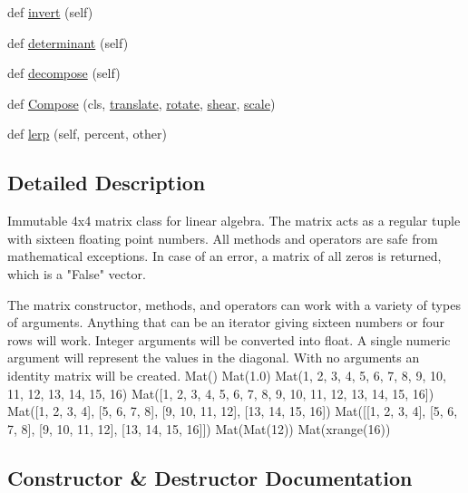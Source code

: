 \begin{DoxyCompactItemize}
\item 
def \hyperlink{classminivec_1_1minivec_1_1_mat_ad39a776c942f5a3939e5bbd95e430f1d}{invert} (self)
\item 
def \hyperlink{classminivec_1_1minivec_1_1_mat_a7b0a26d6c5202fc7fe3b9bc84c7588b9}{determinant} (self)
\item 
def \hyperlink{classminivec_1_1minivec_1_1_mat_a83c559b35a4814f014308d03ddbcdad2}{decompose} (self)
\item 
def \hyperlink{classminivec_1_1minivec_1_1_mat_ab94d8bf4ddf0463496fb78809f73ad9a}{Compose} (cls, \hyperlink{classminivec_1_1minivec_1_1_mat_a6378a96e89d988b74338258e01e8a9c3}{translate}, \hyperlink{classminivec_1_1minivec_1_1_mat_a7d119e23e74d182f54ca330fe9c65a3c}{rotate}, \hyperlink{classminivec_1_1minivec_1_1_mat_a03450442e730a17d66e07614c836418d}{shear}, \hyperlink{classminivec_1_1minivec_1_1_mat_a155e41b3f4f78f7d0264d6ddc113da79}{scale})
\item 
def \hyperlink{classminivec_1_1minivec_1_1_mat_ac420d345a6db8e154b84725c28c0b7de}{lerp} (self, percent, other)
\end{DoxyCompactItemize}


\subsection{Detailed Description}
\begin{DoxyVerb}Immutable 4x4 matrix class for linear algebra.
The matrix acts as a regular tuple with sixteen floating point numbers.
All methods and operators are safe from mathematical exceptions.
In case of an error, a matrix of all zeros is returned, which is a
"False" vector.

The matrix constructor, methods, and operators can work with a
variety of types of arguments. Anything that can be an iterator
giving sixteen numbers or four rows will work.
Integer arguments will be converted into float.
A single numeric argument will represent the values in the diagonal.
With no arguments an identity matrix will be created.
  Mat()
  Mat(1.0)
  Mat(1, 2, 3, 4, 5, 6, 7, 8, 9, 10, 11, 12, 13, 14, 15, 16)
  Mat([1, 2, 3, 4, 5, 6, 7, 8, 9, 10, 11, 12, 13, 14, 15, 16])
  Mat([1, 2, 3, 4], [5, 6, 7, 8], [9, 10, 11, 12], [13, 14, 15, 16])
  Mat([[1, 2, 3, 4], [5, 6, 7, 8], [9, 10, 11, 12], [13, 14, 15, 16]])
  Mat(Mat(12))
  Mat(xrange(16))\end{DoxyVerb}
 

\subsection{Constructor \& Destructor Documentation}
\hypertarget{classminivec_1_1minivec_1_1_mat_a0ccec2a7a5c671a2480ad44d95139bd5}{}
